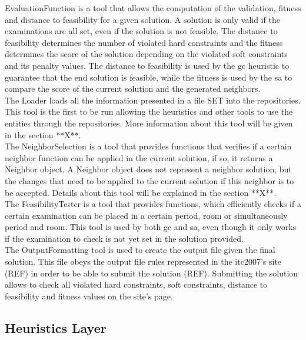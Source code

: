 EvaluationFunction is a tool that allows the computation of the validation, fitness and distance to feasibility for a given solution. A solution is only valid if the examinations are all set, even if the solution is not feasible. The distance to feasibility determines the number of violated hard constraints and the fitness determines the score of the solution depending on the violated soft constraints and its penalty values. The distance to feasibility is used by the \gls{gc} heuristic to guarantee that the end solution is feasible, while the fitness is used by the \gls{sa} to compare the score of the current solution and the generated neighbors.\\

The Loader loads all the information presented in a file SET into the repositories. This tool is the first to be run allowing the heuristics and other tools to use the entities through the repositories. More information about this tool will be given in the {\color{red}section **X**}.\\

The NeighborSelection is a tool that provides functions that verifies if a certain neighbor function can be applied in the current solution, if so, it returns a Neighbor object. A Neighbor object does not represent a neighbor solution, but the changes that need to be applied to the current solution if this neighbor is to be accepted. Details about this tool will be explained in the {\color{red}section **X**}.\\

The FeasibilityTester is a tool that provides functions, which efficiently checks if a certain examination can be placed in a certain period, room or simultaneously period and room. This tool is used by both \gls{gc} and \gls{sa}, even though it only works if the examination to check is not yet set in the solution provided.\\

The OutputFormatting tool is used to create the output file given the final solution. This file obeys the output file rules represented in the \gls{itc2007}'s site {\color{red}(REF)} in order to be able to submit the solution {\color{red}(REF)}. Submitting the solution allows to check all violated hard constraints, soft constraints, distance to feasibility and fitness values on the site's page.

\subsection{Heuristics Layer}

